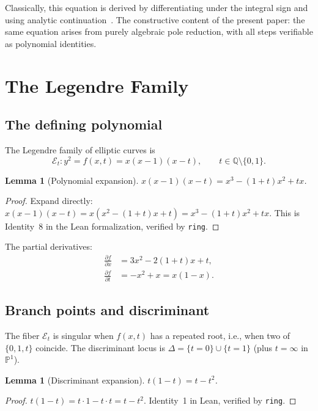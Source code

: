 \documentclass[11pt]{article}
\theoremstyle{plain}
\newtheorem{lemma}[theorem]{Lemma}
\theoremstyle{definition}
\theoremstyle{remark}
\newcommand{\Q}{\mathbb{Q}}
\begin{document}
Classically, this equation is derived by differentiating under the
integral sign and using analytic continuation~\cite{Voisin2002}.  The constructive
content of the present paper: the same equation arises from purely
algebraic pole reduction, with all steps verifiable as polynomial
identities.


\section{The Legendre Family}\label{sec:legendre}

\subsection{The defining polynomial}

The Legendre family of elliptic curves is
\[
  \mathcal{E}_t : y^2 = f(x, t) = x(x-1)(x-t),
  \qquad t \in \Q \setminus \{0, 1\}.
\]

\begin{lemma}[Polynomial expansion]\label{lem:f-expand}
$x(x-1)(x-t) = x^3 - (1+t)x^2 + tx$.
\end{lemma}
\begin{proof}
Expand directly: $x(x-1)(x-t) = x(x^2 - (1+t)x + t) = x^3 - (1+t)x^2 + tx$.
This is Identity~8 in the Lean formalization, verified by \texttt{ring}.
\end{proof}

The partial derivatives:
\begin{align}
  \frac{\partial f}{\partial x} &= 3x^2 - 2(1+t)x + t,
    \label{eq:dfdx} \\
  \frac{\partial f}{\partial t} &= -x^2 + x = x(1-x).
    \label{eq:dfdt}
\end{align}

\subsection{Branch points and discriminant}

The fiber $\mathcal{E}_t$ is singular when $f(x, t)$ has a
repeated root, i.e., when two of $\{0, 1, t\}$ coincide.
The discriminant locus is $\Delta = \{t = 0\} \cup \{t = 1\}$
(plus $t = \infty$ in $\mathbb{P}^1$).

\begin{lemma}[Discriminant expansion]\label{lem:disc}
$t(1-t) = t - t^2$.
\end{lemma}
\begin{proof}
$t(1-t) = t \cdot 1 - t \cdot t = t - t^2$.  Identity~1 in Lean, verified by \texttt{ring}.
\end{proof}
\end{document}
